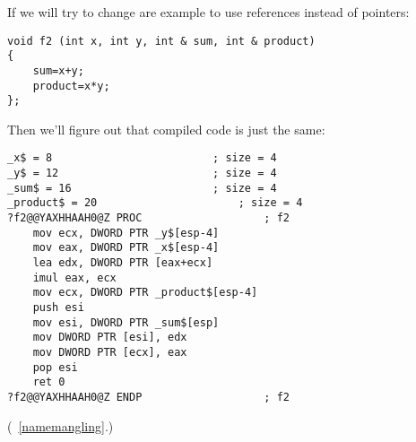 {If we will try to change are example to use references instead of pointers:}

\begin{lstlisting}
void f2 (int x, int y, int & sum, int & product)
{
	sum=x+y;
	product=x*y;
};
\end{lstlisting}

{Then we'll figure out that compiled code is just the same:}

\begin{lstlisting}[caption=\Optimizing MSVC 2010]
_x$ = 8							; size = 4
_y$ = 12						; size = 4
_sum$ = 16						; size = 4
_product$ = 20						; size = 4
?f2@@YAXHHAAH0@Z PROC					; f2
	mov	ecx, DWORD PTR _y$[esp-4]
	mov	eax, DWORD PTR _x$[esp-4]
	lea	edx, DWORD PTR [eax+ecx]
	imul eax, ecx
	mov ecx, DWORD PTR _product$[esp-4]
	push esi
	mov	esi, DWORD PTR _sum$[esp]
	mov	DWORD PTR [esi], edx
	mov	DWORD PTR [ecx], eax
	pop	esi
	ret	0
?f2@@YAXHHAAH0@Z ENDP					; f2
\end{lstlisting}

(~\ref{namemangling}.)

